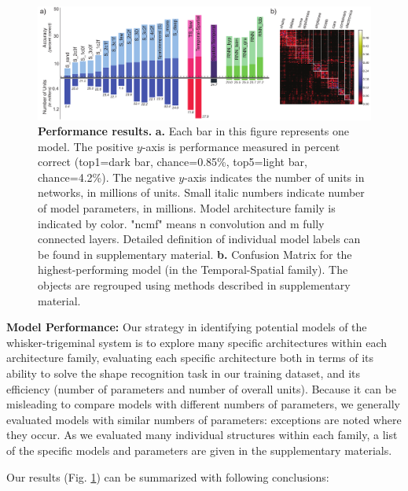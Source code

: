 \begin{figure}
\includegraphics [width=1\linewidth]{figures/results.pdf}
\vspace{-3mm}
\caption{\footnotesize{\textbf{Performance results.} \textbf{a.} Each bar in this figure represents one model. The positive $y$-axis is performance measured in percent correct (top1=dark bar, chance=0.85\%, top5=light bar, chance=4.2\%).  The negative $y$-axis indicates the number of units in networks, in millions of units.  Small italic numbers indicate number of model parameters, in millions. Model architecture family is indicated by color. "ncmf" means n convolution and m fully connected layers. Detailed definition of individual model labels can be found in supplementary material. \textbf{b.} Confusion Matrix for the highest-performing model (in the Temporal-Spatial family). The objects are regrouped using methods described in supplementary material.}~\label{fig_main}}
\vspace{-5mm}
\end{figure}

\textbf{Model Performance:} 
Our strategy in identifying potential models of the whisker-trigeminal system is to explore many specific architectures within each architecture family, evaluating each specific architecture both in terms of its ability to solve the shape recognition task in our training dataset, and its efficiency (number of parameters and number of overall units).
Because it can be misleading to compare models with different numbers of parameters, we generally evaluated models with similar numbers of parameters: exceptions are noted where they occur.
As we evaluated many individual structures within each family, a list of the specific models and parameters are given in the supplementary materials.

Our results (Fig. \ref{fig_main}) can be summarized with following conclusions:

